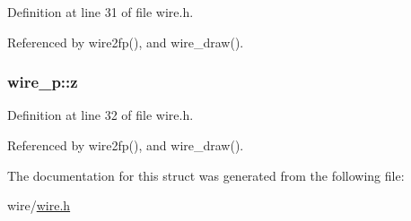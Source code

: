 Definition at line 31 of file wire.\-h.



Referenced by wire2fp(), and wire\-\_\-draw().

\hypertarget{structwire__p_a423cfb83825fc447478c866e4c2f6520}{
\subsubsection[{z}]{ wire\-\_\-p\-::z}}\label{structwire__p_a423cfb83825fc447478c866e4c2f6520}


Definition at line 32 of file wire.\-h.



Referenced by wire2fp(), and wire\-\_\-draw().



The documentation for this struct was generated from the following file\-:\begin{DoxyCompactItemize}
\item 
wire/\hyperlink{wire_8h}{wire.\-h}\end{DoxyCompactItemize}
